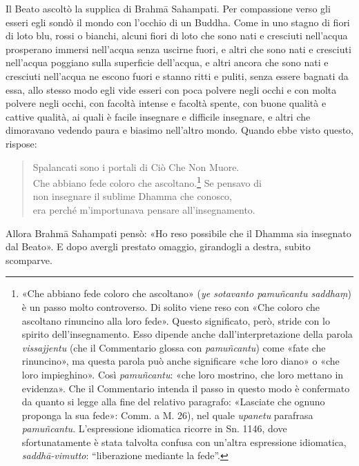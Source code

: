 Il Beato ascoltò la supplica di Brahmā Sahampati. Per compassione verso gli
esseri egli sondò il mondo con l’occhio di un Buddha. Come in uno stagno di
fiori di loto blu, rossi o bianchi, alcuni fiori di loto che sono nati e
cresciuti nell’acqua prosperano immersi nell’acqua senza uscirne fuori, e altri
che sono nati e cresciuti nell’acqua poggiano sulla superficie dell’acqua, e
altri ancora che sono nati e cresciuti nell’acqua ne escono fuori e stanno ritti
e puliti, senza essere bagnati da essa, allo stesso modo egli vide esseri con
poca polvere negli occhi e con molta polvere negli occhi, con facoltà intense e
facoltà spente, con buone qualità e cattive qualità, ai quali è facile insegnare
e difficile insegnare, e altri che dimoravano vedendo paura e biasimo nell’altro
mondo. Quando ebbe visto questo, rispose:

\begin{quote}
Spalancati sono i portali di Ciò Che Non Muore. \\
Che abbiano fede coloro che ascoltano.\footnote{«Che abbiano fede coloro che ascoltano» (\emph{ye sotavanto pamuñcantu saddhaṃ}) è un passo molto controverso. Di solito viene reso con «Che coloro che ascoltano rinuncino alla loro fede». Questo significato, però, stride con lo spirito dell’insegnamento. Esso dipende anche dall’interpretazione della parola \emph{vissajjentu} (che il Commentario glossa con \emph{pamuñcantu}) come «fate che rinuncino», ma questa parola può anche significare «che loro diano» o «che loro impieghino». Così \emph{pamuñcantu}: «che loro mostrino, che loro mettano in evidenza». Che il Commentario intenda il passo in questo modo è confermato da quanto si legge alla fine del relativo paragrafo: «Lasciate che ognuno proponga la sua fede»: Comm. a M. 26), nel quale \emph{upanetu} parafrasa \emph{pamuñcantu}. L’espressione idiomatica ricorre in Sn. 1146, dove sfortunatamente è stata talvolta confusa con un’altra espressione idiomatica, \emph{saddhā-vimutto}: “liberazione mediante la fede”.} Se pensavo di \\
non insegnare il sublime Dhamma che conosco, \\
era perché m’importunava pensare all’insegnamento.
\end{quote}

Allora Brahmā Sahampati pensò: «Ho reso possibile che il Dhamma sia insegnato
dal Beato». E dopo avergli prestato omaggio, girandogli a destra, subito
scomparve.


